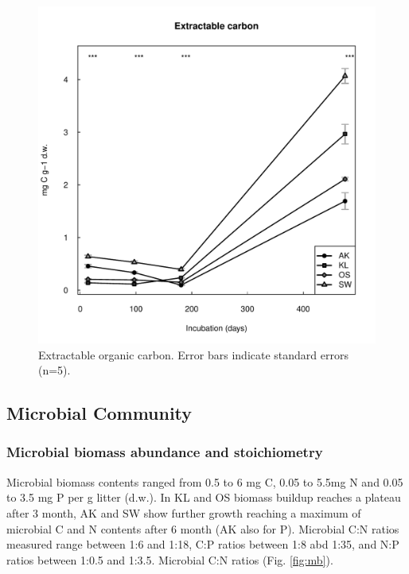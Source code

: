 \documentclass[authoryear,preprint,review,12pt]{elsarticle}
\begin{document}
\begin{figure}[t]
\vspace*{2mm}
\begin{center}
\includegraphics{sbb-doc}
\end{center}
\caption{Extractable organic carbon. Error bars indicate standard errors (n=5).}
\label{fig:doc}
\end{figure}


\subsection{Microbial Community}



\subsubsection{Microbial biomass abundance and stoichiometry}

Microbial biomass contents ranged from 0.5 to 6 mg C, 0.05 to 5.5mg N and 0.05 to 3.5 mg P per g litter (d.w.). In KL and OS biomass buildup reaches a plateau after 3 month, AK and SW show further growth reaching a maximum of microbial C and N contents after 6 month (AK also for P). Microbial C:N ratios measured range between 1:6 and 1:18, C:P ratios between 1:8 abd 1:35, and N:P ratios between 1:0.5 and 1:3.5. Microbial C:N ratios (Fig. \ref{fig:mb}).
\end{document}
